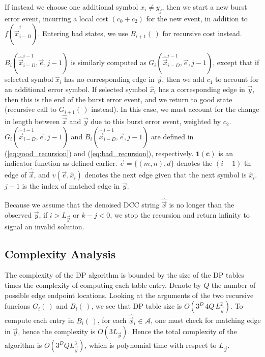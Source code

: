 If instead we choose one additional symbol $\hat{x}_i \neq y_j$, then we start a new burst error event, incurring a local cost $(c_0 + c_2)$ for the new event, in addition to $f(\hat{\vec{x}}^i_{i-D})$.
Entering bad states, we use $B_{i+1}(\,)$ for recursive cost instead. 

$B_i(\hat{\vec{x}}_{i-D}^{i-1},\vec{e},j-1)$ is similarly computed as $G_i(\hat{\vec{x}}_{i-D}^{i-1},\vec{e},j-1)$, except that if selected symbol $\hat{x}_i$ has no corresponding edge in $\vec{y}$, then we add $c_1$ to account for an additional error symbol. 
If selected symbol $\hat{x}_i$ has a corresponding edge in $\vec{y}$, then this is the end of the burst error event, and we return to good state (recursive call to $G_{i+1}(\,)$ instead). In this case, we must account for the change in length between $\hat{\vec{x}}$ and $\vec{y}$ due to this burst error event, weighted by $c_2$. 
$G_i(\hat{\vec{x}}_{i-D}^{i-1},\vec{e},j-1)$ and $B_i(\hat{\vec{x}}_{i-D}^{i-1},\vec{e},j-1)$ are defined in (\ref{eq:good_recursion}) and (\ref{eq:bad_recursion}), respectively. 
$\mathbf{1}(\mathbf{c})$ is an indicator function as defined earlier. 
$\vec{e}=\{(m,n),d\}$ denotes the $(i-1)$-th edge of $\hat{\vec{x}}$, and $v(\vec{e},\hat{x}_i)$ denotes the next edge given that the next symbol is $\hat{x}_i$. $j-1$ is the index of matched edge in $\vec{y}$.

Because we assume that the denoised DCC string $\hat{\vec{x}}$ is no longer than the observed $\vec{y}$, if $i>L_{\vec{y}}$ or $k-j < 0$, we stop the recursion and return infinity to signal an invalid solution.


\subsection{Complexity Analysis}
\label{subsec:algorithm_complexity}


The complexity of the DP algorithm is bounded by the size of the DP tables times the complexity of computing each table entry. 
Denote by $Q$ the number of possible edge endpoint locations.
Looking at the arguments of the two recursive funcions $G_i(\,)$ and $B_i(\,)$, we see that DP table size is $O(3^D \,  4Q \, L_{\vec{y}}^2)$. 
To compute each entry in $B_i(\,)$, for each $\hat{\vec{x}}_i \in \mathcal{A}$,  one must check for matching edge in $\vec{y}$, hence the complexity is $O(3 L_{\vec{y}})$. 
Hence the total complexity of the algorithm is $O(3^D Q L_{\vec{y}}^3)$, which is polynomial time with respect to $L_{\vec{y}}$.


